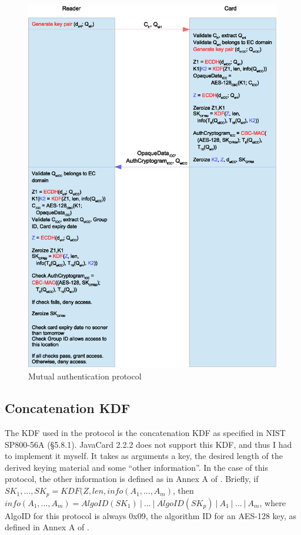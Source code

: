 \documentclass[12pt,a4paper,twoside,openright]{report}
\begin{document}
\begin{figure}[tbh]
\centerline{\includegraphics[scale=0.8]{figures/mutualauth.eps}}
\caption{Mutual authentication protocol}
\label{fig:mutualauth}
\end{figure}

\subsection{Concatenation KDF}

The KDF used in the protocol is the concatenation KDF as specified in NIST SP800-56A \cite{nistsp80056a} (\S5.8.1). JavaCard 2.2.2 does not support this KDF, and thus I had to implement it myself. It takes as arguments a key, the desired length of the derived keying material and some ``other information''. In the case of this protocol, the other information is defined as in Annex A of \cite{OPACITY}. Briefly, if $SK_1, ..., SK_p =  KDF(Z, len, info(A_1, ..., A_m)$, then $info(A_1, ..., A_m) = AlgoID(SK_1)~\vert~...~\vert~AlgoID(SK_p)~\vert~A_1~\vert~...~\vert~A_m$, where AlgoID for this protocol is always 0x09, the algorithm ID for an AES-128 key, as defined in Annex A of \cite{OPACITY}.
\end{document}
